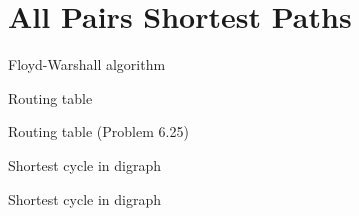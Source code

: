 \section{All Pairs Shortest Paths}

\begin{frame}{Floyd-Warshall algorithm}
\end{frame}
\begin{frame}{Routing table}
  \begin{exampleblock}{Routing table (Problem 6.25)}
  \end{exampleblock}
\end{frame}
\begin{frame}{Shortest cycle in digraph}
  \begin{exampleblock}{Shortest cycle in digraph}
  \end{exampleblock}
\end{frame}
